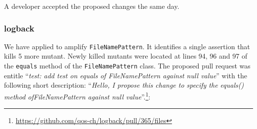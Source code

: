 \begin{figure}[H]
	\centering{}
\end{figure}

A developer accepted the proposed changes the same day.


\subsubsection{logback}

We have applied \dspot to amplify \texttt{FileNamePattern}. It identifies a single assertion that kills 5 more mutant. Newly killed mutants were located at lines 94, 96 and 97 of the \texttt{equals} method of the \texttt{FileNamePattern} class. The proposed pull request was entitle ``\emph{test: add test on equals of FileNamePattern against null value}'' with the following short description: ``\emph{Hello, I propose this change to specify the equals() method ofFileNamePattern against null value}''.\footnote{\url{https://github.com/qos-ch/logback/pull/365/files}}:

